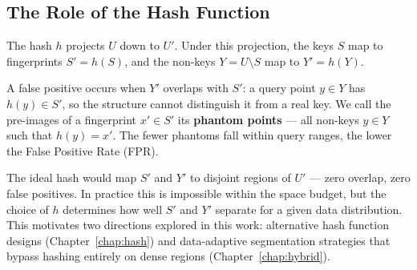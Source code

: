 \subsection{The Role of the Hash Function}
\label{sec:hash-role}

The hash $h$ projects $U$ down to $U'$.
Under this projection, the keys $S$ map to fingerprints $S' = h(S)$, and the
non-keys $Y = U \setminus S$ map to $Y' = h(Y)$.

A false positive occurs when $Y'$ overlaps with $S'$: a query point $y \in Y$ has
$h(y) \in S'$, so the structure cannot distinguish it from a real key.
We call the pre-images of a fingerprint $x' \in S'$ its \textbf{phantom points} --- all non-keys $y \in Y$ such that $h(y) = x'$.
The fewer phantoms fall within query ranges, the lower the False Positive Rate (FPR).

The ideal hash would map $S'$ and $Y'$ to disjoint regions of $U'$ --- zero
overlap, zero false positives.
In practice this is impossible within the space budget,
but the choice of $h$ determines how well $S'$ and $Y'$ separate for a given data distribution.
This motivates two directions explored in this work: alternative hash
function designs (Chapter~\ref{chap:hash}) and data-adaptive segmentation strategies
that bypass hashing entirely on dense regions (Chapter~\ref{chap:hybrid}).
